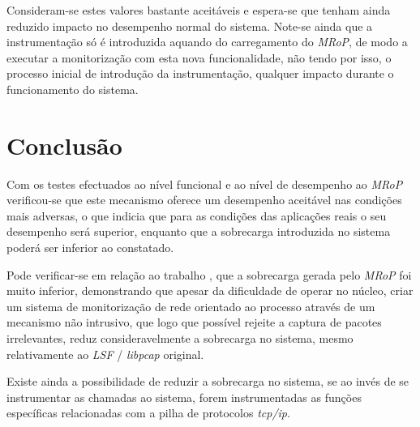 Consideram-se estes valores bastante aceitáveis e espera-se que tenham ainda reduzido impacto no desempenho normal do sistema.
Note-se ainda que a instrumentação só é introduzida aquando do carregamento do \textit{MRoP}, de modo a executar a monitorização com esta nova funcionalidade, não tendo por isso, o processo inicial de introdução da instrumentação, qualquer impacto durante o funcionamento do sistema.

\section{Conclusão}
\label{sec:five_chap_conclusion}

Com os testes efectuados ao nível funcional e ao nível de desempenho ao \textit{MRoP} verificou-se que este mecanismo oferece um desempenho aceitável nas condições mais adversas, o que indicia que para as condições das aplicações reais o seu desempenho será superior, enquanto que a sobrecarga introduzida no sistema poderá ser inferior ao constatado.

Pode verificar-se em relação ao trabalho \cite{Farruca:2009}, que a sobrecarga gerada pelo \textit{MRoP} foi muito inferior, demonstrando que apesar da dificuldade de operar no núcleo, criar um sistema de monitorização de rede orientado ao processo através de um mecanismo não intrusivo, que logo que possível rejeite a captura de pacotes irrelevantes, reduz consideravelmente a sobrecarga no sistema, mesmo relativamente ao \textit{LSF} / \textit{libpcap} original.

Existe ainda a possibilidade de reduzir a sobrecarga no sistema, se ao invés de se instrumentar as chamadas ao sistema, forem instrumentadas as funções específicas relacionadas com a pilha de protocolos \textit{tcp/ip}.

